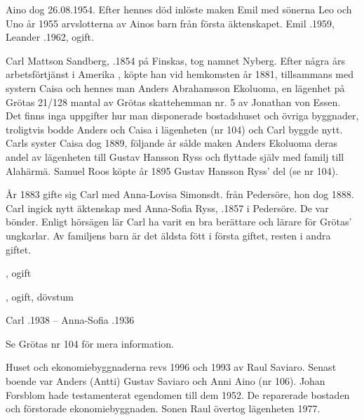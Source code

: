 Aino dog 26.08.1954. Efter hennes död inlöste maken Emil med sönerna Leo och Uno år 1955 arvslotterna av Ainos barn från  första äktenskapet.
Emil .1959, Leander .1962, ogift.


Carl Mattson Sandberg, .1854 på Finskas, tog namnet Nyberg. Efter några års arbetsförtjänst i Amerika , köpte han vid hemkomsten år 1881, tillsammans med systern Caisa och hennes man Anders Abrahamsson Ekoluoma, en lägenhet på Grötas 21/128 mantal av Grötas skattehemman nr. 5 av Jonathan von Essen. Det finns inga uppgifter hur man disponerade bostadshuset och övriga byggnader, troligtvis bodde Anders och Caisa i lägenheten (nr 104) och Carl byggde nytt. Carls syster Caisa dog 1889, följande år sålde maken Anders Ekoluoma deras andel av lägenheten till Gustav Hansson Ryss och flyttade själv med familj till Alahärmä. Samuel Roos köpte år 1895 Gustav Hansson Ryss' del (se nr 104).

År 1883 gifte sig Carl med  Anna-Lovisa Simonsdt. från Pedersöre, hon dog 1888. Carl ingick nytt äktenskap med Anna-Sofia Ryss, .1857 i Pedersöre. De var bönder. Enligt hörsägen lär Carl ha varit en bra berättare och lärare för Grötas' ungkarlar. Av familjens barn är det äldsta fött i första giftet, resten i andra giftet.
\begin{jhchildren}
  \item {}, ogift
  \item {}
  \item {}
  \item {}, ogift, dövstum
\end{jhchildren}
Carl .1938  --  Anna-Sofia .1936


Se Grötas nr 104 för mera information.




Huset och ekonomiebyggnaderna revs 1996 och 1993 av Raul Saviaro. Senast boende var Anders (Antti) Gustav Saviaro och Anni Aino (nr 106). Johan Forsblom hade testamenterat egendomen till dem 1952. De reparerade bostaden och förstorade ekonomiebyggnaden. Sonen Raul övertog lägenheten 1977.

